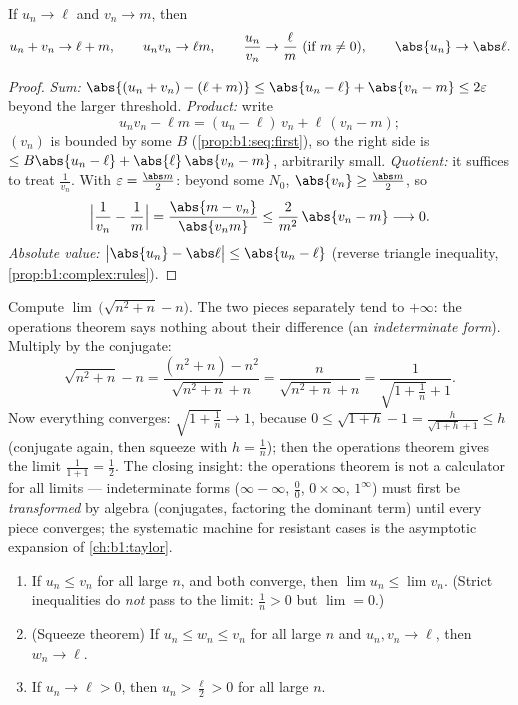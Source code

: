 \begin{theorem}\label{thm:b1:seq:operations}
If $u_n \to \ell$ and $v_n \to m$, then
\[
u_n + v_n \to \ell + m, \qquad u_n v_n \to \ell m, \qquad
\frac{u_n}{v_n} \to \frac{\ell}{m} \ (\text{if } m \neq 0),
\qquad \abs{u_n} \to \abs\ell .
\]
\end{theorem}

\begin{proof}
\emph{Sum:} $\abs{(u_n + v_n) - (\ell + m)} \leq \abs{u_n - \ell} +
\abs{v_n - m} \leq 2\varepsilon$ beyond the larger threshold.
\emph{Product:} write
\[
u_n v_n - \ell m = (u_n - \ell)\,v_n + \ell\,(v_n - m);
\]
$(v_n)$ is bounded by some $B$ (\cref{prop:b1:seq:first}), so the
right side is $\leq B\abs{u_n - \ell} + \abs{\ell}\,\abs{v_n - m}$,
arbitrarily small. \emph{Quotient:} it suffices to treat $\frac
1{v_n}$. With $\varepsilon = \frac{\abs m}{2}$: beyond some $N_0$,
$\abs{v_n} \geq \frac{\abs m}{2}$, so
\[
\Bigl| \frac{1}{v_n} - \frac 1m \Bigr|
= \frac{\abs{m - v_n}}{\abs{v_n m}}
\leq \frac{2}{m^2}\,\abs{v_n - m} \longrightarrow 0 .
\]
\emph{Absolute value:} $\bigl|\abs{u_n} - \abs\ell\bigr| \leq
\abs{u_n - \ell}$ (reverse triangle inequality,
\cref{prop:b1:complex:rules}).
\end{proof}

\begin{example}\label{ex:b1:seq:conjugatetrick}
Compute $\lim\,\bigl(\sqrt{n^2 + n} - n\bigr)$. The two pieces
separately tend to $+\infty$: the operations theorem says nothing
about their difference (an \emph{indeterminate form}). Multiply
by the conjugate:
\[
\sqrt{n^2 + n} - n
= \frac{(n^2 + n) - n^2}{\sqrt{n^2 + n} + n}
= \frac{n}{\sqrt{n^2+n} + n}
= \frac{1}{\sqrt{1 + \frac1n} + 1} .
\]
Now everything converges: $\sqrt{1 + \frac1n} \to 1$, because
$0 \leq \sqrt{1 + h} - 1 = \frac{h}{\sqrt{1+h} + 1} \leq h$
(conjugate again, then squeeze with $h = \frac1n$); then the
operations theorem gives the limit $\frac{1}{1 + 1} =
\frac12$. The closing insight: the operations theorem is not a
calculator for all limits --- indeterminate forms ($\infty -
\infty$, $\frac00$, $0 \times \infty$, $1^\infty$) must first be
\emph{transformed} by algebra (conjugates, factoring the dominant
term) until every piece converges; the systematic machine for
resistant cases is the asymptotic expansion of
\cref{ch:b1:taylor}.
\end{example}

\begin{theorem}\label{thm:b1:seq:order}
\begin{enumerate}
  \item If $u_n \leq v_n$ for all large $n$, and both converge, then
        $\lim u_n \leq \lim v_n$. (Strict inequalities do \emph{not}
        pass to the limit: $\frac 1n > 0$ but $\lim = 0$.)
  \item (Squeeze theorem) If $u_n \leq w_n
        \leq v_n$ for all large $n$ and $u_n, v_n \to \ell$, then
        $w_n \to \ell$.
  \item If $u_n \to \ell > 0$, then $u_n > \frac\ell2 > 0$ for all
        large $n$.
\end{enumerate}
\end{theorem}

